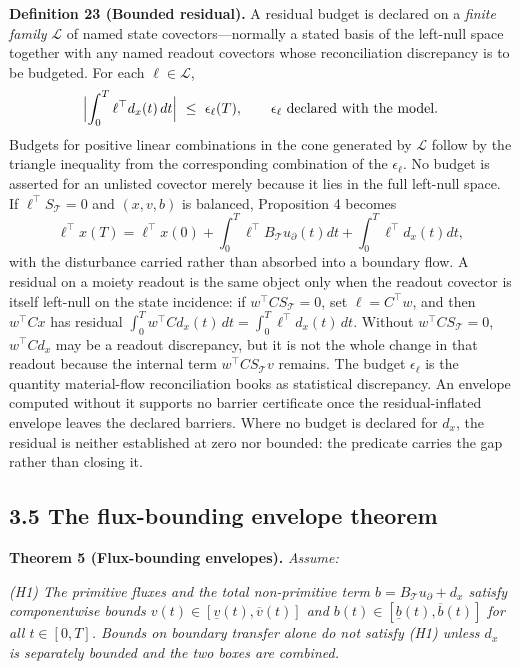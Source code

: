 \documentclass[11pt]{article}
\begin{document}
\textbf{Definition 23 (Bounded residual).} A residual budget is declared on a \emph{finite family} \(\mathcal L\) of named state covectors---normally a stated basis of the left-null space together with any named readout covectors whose reconciliation discrepancy is to be budgeted. For each \(\ell\in\mathcal L\),
$$\Bigl|\int_0^T\ell^{\top}d_x(t)\,dt\Bigr|\ \le\ \epsilon_\ell(T), \qquad \epsilon_\ell\ \text{declared with the model}.$$
Budgets for positive linear combinations in the cone generated by \(\mathcal L\) follow by the triangle inequality from the corresponding combination of the \(\epsilon_\ell\). No budget is asserted for an unlisted covector merely because it lies in the full left-null space. If \(\ell^\top S_{\mathcal{T}}=0\) and \((x,v,b)\) is balanced, Proposition 4 becomes
$$\ell^\top x(T)=\ell^\top x(0)+\int_0^T\ell^\top B_{\mathcal{T}}u_\partial(t)dt+\int_0^T\ell^\top d_x(t)dt,$$
with the disturbance carried rather than absorbed into a boundary flow. A residual on a moiety readout is the same object only when the readout covector is itself left-null on the state incidence: if \(w^\top CS_{\mathcal{T}}=0\), set \(\ell=C^\top w\), and then \(w^\top Cx\) has residual \(\int_0^T w^\top C d_x(t)\,dt=\int_0^T\ell^\top d_x(t)\,dt\). Without \(w^\top CS_{\mathcal{T}}=0\), \(w^\top C d_x\) may be a readout discrepancy, but it is not the whole change in that readout because the internal term \(w^\top CS_{\mathcal{T}}v\) remains. The budget \(\epsilon_\ell\) is the quantity material-flow reconciliation books as statistical discrepancy. An envelope computed without it supports no barrier certificate once the residual-inflated envelope leaves the declared barriers. Where no budget is declared for \(d_x\), the residual is neither established at zero nor bounded: the predicate carries the gap rather than closing it.

\subsection*{3.5 The flux-bounding envelope theorem}\label{35-the-flux-bounding-envelope-theorem}

\textbf{Theorem 5 (Flux-bounding envelopes).} \emph{Assume:}

\emph{(H1) The primitive fluxes and the total non-primitive term \(b=B_{\mathcal{T}}u_\partial+d_x\) satisfy componentwise bounds \(v(t) \in [\underline{v}(t), \overline{v}(t)]\) and \(b(t) \in [\underline{b}(t), \overline{b}(t)]\) for all \(t \in [0,T]\). Bounds on boundary transfer alone do not satisfy (H1) unless \(d_x\) is separately bounded and the two boxes are combined.}
\end{document}
